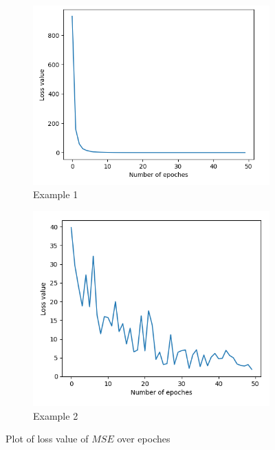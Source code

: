 \documentclass[11pt,a4paper]{IEEEtran}
\begin{document}
\begin{figure}[!hbt]
	\begin{subfigure}[b]{0.45\textwidth}
		\includegraphics[width=\textwidth]{examples/1/loss.png}
		\caption{Example 1}
		\label{fig:loss1:1}
	\end{subfigure}
	\begin{subfigure}[b]{0.45\textwidth}
		\includegraphics[width=\textwidth]{examples/2/loss.png}
		\caption{Example 2}
		\label{fig:loss1:2}
	\end{subfigure}
	\caption{Plot of loss value of $MSE$ over epoches}
	\label{fig:loss1}
\end{figure}
\end{document}

